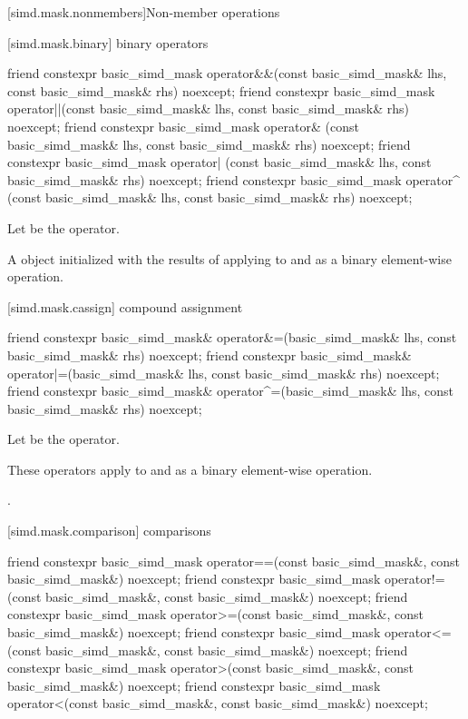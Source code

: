 [simd.mask.nonmembers]{Non-member operations}

[simd.mask.binary]{ binary operators}

\begin{itemdecl}
friend constexpr basic_simd_mask
  operator&&(const basic_simd_mask& lhs, const basic_simd_mask& rhs) noexcept;
friend constexpr basic_simd_mask
  operator||(const basic_simd_mask& lhs, const basic_simd_mask& rhs) noexcept;
friend constexpr basic_simd_mask
  operator& (const basic_simd_mask& lhs, const basic_simd_mask& rhs) noexcept;
friend constexpr basic_simd_mask
  operator| (const basic_simd_mask& lhs, const basic_simd_mask& rhs) noexcept;
friend constexpr basic_simd_mask
  operator^ (const basic_simd_mask& lhs, const basic_simd_mask& rhs) noexcept;
\end{itemdecl}

\begin{itemdescr}
  \pnum Let \op{} be the operator.

  \pnum\returns
  A  object initialized with the results of applying \op{}
  to  and  as a binary element-wise operation.
\end{itemdescr}

[simd.mask.cassign]{ compound assignment}

\begin{itemdecl}
friend constexpr basic_simd_mask&
  operator&=(basic_simd_mask& lhs, const basic_simd_mask& rhs) noexcept;
friend constexpr basic_simd_mask&
  operator|=(basic_simd_mask& lhs, const basic_simd_mask& rhs) noexcept;
friend constexpr basic_simd_mask&
  operator^=(basic_simd_mask& lhs, const basic_simd_mask& rhs) noexcept;
\end{itemdecl}

\begin{itemdescr}
  \pnum Let \op{} be the operator.

  \pnum\effects
  These operators apply \op{} to  and  as a binary
  element-wise operation.

  \pnum\returns
  .
\end{itemdescr}

[simd.mask.comparison]{ comparisons}

\begin{itemdecl}
friend constexpr basic_simd_mask
  operator==(const basic_simd_mask&, const basic_simd_mask&) noexcept;
friend constexpr basic_simd_mask
  operator!=(const basic_simd_mask&, const basic_simd_mask&) noexcept;
friend constexpr basic_simd_mask
  operator>=(const basic_simd_mask&, const basic_simd_mask&) noexcept;
friend constexpr basic_simd_mask
  operator<=(const basic_simd_mask&, const basic_simd_mask&) noexcept;
friend constexpr basic_simd_mask
  operator>(const basic_simd_mask&, const basic_simd_mask&) noexcept;
friend constexpr basic_simd_mask
  operator<(const basic_simd_mask&, const basic_simd_mask&) noexcept;
\end{itemdecl}

